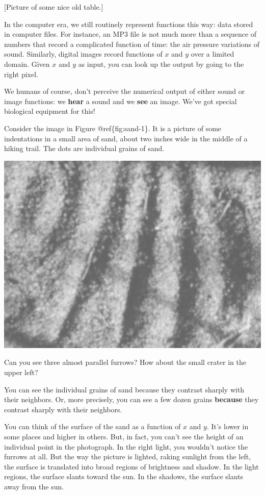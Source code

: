 \documentclass[
]{book}
\begin{document}
{[}Picture of some nice old table.{]}

In the computer era, we still routinely represent functions this way: data stored in computer files. For instance, an MP3 file is not much more than a sequence of numbers that record a complicated function of time: the air pressure variations of sound. Similarly, digital images record functions of \(x\) and \(y\) over a limited domain. Given \(x\) and \(y\) as input, you can look up the output by going to the right pixel.

We humans of course, don't perceive the numerical output of either sound or image functions: we \textbf{hear} a sound and we \textbf{see} an image. We've got special biological equipment for this!

Consider the image in Figure @ref\{fig:sand-1\}. It is a picture of some indentations in a small area of sand, about two inches wide in the middle of a hiking trail. The dots are individual grains of sand.

\begin{center}\includegraphics[width=0.5\linewidth]{www/sand-furrows} \end{center}

Can you see three almost parallel furrows? How about the small crater in the upper left?

You can see the individual grains of sand because they contrast sharply with their neighbors. Or, more precisely, you can see a few dozen grains \textbf{because} they contrast sharply with their neighbors.

You can think of the surface of the sand as a function of \(x\) and \(y\). It's lower in some places and higher in others. But, in fact, you can't see the height of an individual point in the photograph. In the right light, you wouldn't notice the furrows at all. But the way the picture is lighted, raking sunlight from the left, the surface is translated into broad regions of brightness and shadow. In the light regions, the surface slants toward the sun. In the shadows, the surface slants away from the sun.
\end{document}

